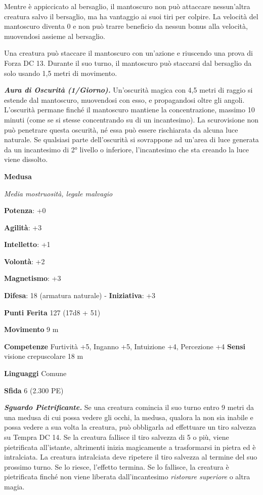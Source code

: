 \begin{multicols}{2}
Mentre è appiccicato al bersaglio, il mantoscuro non può attaccare
nessun'altra creatura salvo il bersaglio, ma ha vantaggio ai suoi tiri
per colpire. La velocità del mantoscuro diventa 0 e non può trarre
beneficio da nessun bonus alla velocità, muovendosi assieme al
bersaglio.

Una creatura può staccare il mantoscuro con un'azione e riuscendo una
prova di Forza DC 13. Durante il suo turno, il mantoscuro può staccarsi
dal bersaglio da solo usando 1,5 metri di movimento.

\emph{\textbf{Aura di Oscurità (1/Giorno).}} Un'oscurità magica con 4,5
metri di raggio si estende dal mantoscuro, muovendosi con esso, e
propagandosi oltre gli angoli. L'oscurità permane finché il mantoscuro
mantiene la concentrazione, massimo 10 minuti (come se si stesse
concentrando su di un incantesimo). La scurovisione non può penetrare
questa oscurità, né essa può essere rischiarata da alcuna luce naturale.
Se qualsiasi parte dell'oscurità si sovrappone ad un'area di luce
generata da un incantesimo di 2° livello o inferiore, l'incantesimo che
sta creando la luce viene dissolto.

\textbf{Medusa}

\emph{Media mostruosità, legale malvagio}

\textbf{Potenza}: +0

\textbf{Agilità}: +3

\textbf{Intelletto}: +1

\textbf{Volontà}: +2

\textbf{Magnetismo}: +3

\textbf{Difesa}: 18 (armatura naturale) - \textbf{Iniziativa}: +3

\textbf{Punti Ferita} 127 (17d8 + 51)

\textbf{Movimento} 9 m

\textbf{Competenze} Furtività +5, Inganno +5, Intuizione +4, Percezione +4
\textbf{Sensi} visione crepuscolare 18 m

\textbf{Linguaggi} Comune

\textbf{Sfida} 6 (2.300 PE)

\emph{\textbf{Sguardo Pietrificante.}} Se una creatura comincia il suo
turno entro 9 metri da una medusa di cui possa vedere gli occhi, la
medusa, qualora la non sia inabile e possa vedere a sua volta la
creatura, può obbligarla ad effettuare un tiro salvezza su Tempra
DC 14. Se la creatura fallisce il tiro salvezza di 5 o più, viene
pietrificata all'istante, altrimenti inizia magicamente a trasformarsi
in pietra ed è intralciata. La creatura intralciata deve ripetere il
tiro salvezza al termine del suo prossimo turno. Se lo riesce, l'effetto
termina. Se lo fallisce, la creatura è pietrificata finché non viene
liberata dall'incantesimo \emph{ristorare superiore} o altra magia.


\end{multicols}
